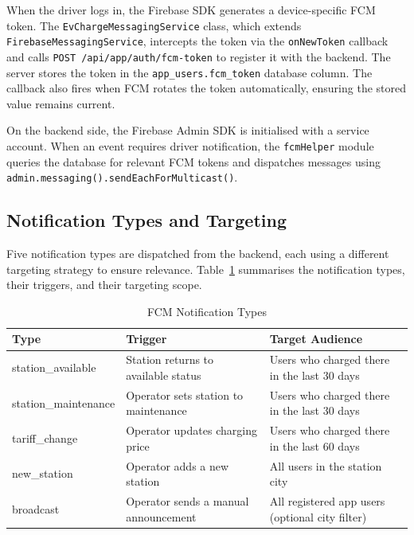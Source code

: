 \documentclass[12pt,a4paper]{report}
\begin{document}
\begin{sloppypar}
When the driver logs in, the Firebase SDK generates a device-specific FCM token. The
\texttt{EvChargeMessagingService} class, which extends \texttt{FirebaseMessagingService},
intercepts the token via the \texttt{onNewToken} callback and calls
\texttt{POST /api/app/auth/fcm-token} to register it with the backend. The server stores the
token in the \texttt{app\_users.fcm\_token} database column. The callback also fires when FCM
rotates the token automatically, ensuring the stored value remains current.

On the backend side, the Firebase Admin SDK is initialised with a service account. When an
event requires driver notification, the \texttt{fcmHelper} module queries the database for
relevant FCM tokens and dispatches messages using
\texttt{admin.messaging().sendEachForMulticast()}.
\end{sloppypar}

\subsection{Notification Types and Targeting}

Five notification types are dispatched from the backend, each using a different targeting
strategy to ensure relevance. Table~\ref{tab:fcm-types} summarises the notification types,
their triggers, and their targeting scope.

\begin{table}[h!]
  \centering
  \caption{FCM Notification Types}
  \label{tab:fcm-types}
  \renewcommand{\arraystretch}{1.3}
  \begin{tabular}{|>{\ttfamily\small}p{4cm}|p{4.5cm}|p{5cm}|}
    \hline
    \normalfont\textbf{Type} & \textbf{Trigger} & \textbf{Target Audience} \\ \hline
    station\_available    & Station returns to available status   & Users who charged there in the last 30 days \\ \hline
    station\_maintenance  & Operator sets station to maintenance  & Users who charged there in the last 30 days \\ \hline
    tariff\_change        & Operator updates charging price       & Users who charged there in the last 60 days \\ \hline
    new\_station          & Operator adds a new station           & All users in the station city \\ \hline
    broadcast             & Operator sends a manual announcement  & All registered app users (optional city filter) \\ \hline
  \end{tabular}
\end{table}
\end{document}

